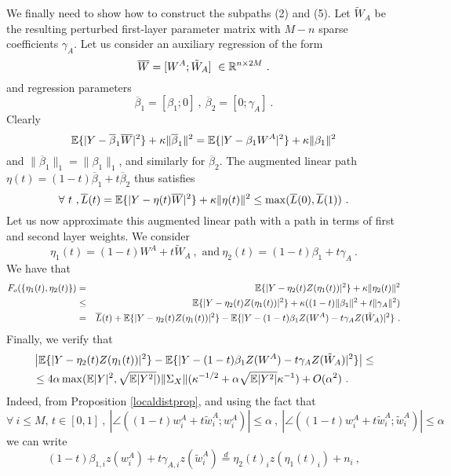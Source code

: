 We finally need to show how to construct the subpaths (2) and (5).
Let $\tilde{W}_A$ be the resulting perturbed first-layer parameter matrix 
with $M-n$ sparse coefficients $\gamma_A$.
Let us consider an auxiliary regression of the form 
$$\overline{W} = [ W^A ; \tilde{W}_A] ~\in {\mathbb{R}}^{n \times 2M}~.$$
and regression parameters 
$$\overline{\beta}_1 = [ \beta_1; 0]~,~\overline{\beta}_2 = [0; \gamma_A]~.$$
Clearly 
$${\mathbb{E}}\{ | Y - \overline{\beta}_1 \overline{W} |^2 \} + \kappa \| \overline{\beta}_1 \|^2 = {\mathbb{E}}\{ | Y - \beta_1 W^A |^2 \} + \kappa \| {\beta}_1 \|^2 $$ 
and $\| \overline{\beta}_1 \|_1 = \| \beta_1 \|_1$, and similarly for $\overline{\beta}_2$. The augmented linear path $\eta(t) =(1- t) \overline{\beta}_1 + t \overline{\beta}_2$ thus satisfies 
$$\forall~t~,\overline{L}(t) = {\mathbb{E}}\{ | Y - \eta(t) \overline{W} |^2 \} + \kappa \| \eta(t) \|^2 \leq \max(\overline{L}(0), \overline{L}(1))~. $$
Let us now approximate this augmented linear path with a path in terms of first and second layer weights. 
We consider
$$\eta_1(t) = (1-t) W^A + t \tilde{W}_A~,\text{ and}~\eta_2(t) = (1- t) {\beta}_1 + t \gamma_A~.$$
We have that 
\begin{eqnarray}
\label{bub1}
F_{o}(\{ \eta_1(t), \eta_2(t) \}) &=& {\mathbb{E}} \{ | Y - \eta_2(t) Z(\eta_1(t) ) |^2 \} + \kappa \| \eta_2(t) \|^2  \\ 
&\leq & {\mathbb{E}} \{ | Y - \eta_2(t) Z(\eta_1(t) ) |^2 \} + \kappa(  ( 1-t) \| {\beta}_1\|^2 + t \| \gamma_A \|^2 ) \nonumber \\
& = & \overline{L}(t) + {\mathbb{E}} \{ | Y - \eta_2(t) Z(\eta_1(t) ) |^2 \}  - {\mathbb{E}} \{ | Y - (1-t) \beta_1 Z(W^A) - t \gamma_A Z(\tilde{W}_A) |^2 \} ~.  \nonumber
\end{eqnarray}
Finally, we verify that
{\small 
\begin{eqnarray}
\label{bub2}
& \left | {\mathbb{E}} \{ | Y - \eta_2(t) Z(\eta_1(t) ) |^2 \}  - {\mathbb{E}} \{ | Y - (1-t) \beta_1 Z(W^A) - t \gamma_A Z(\tilde{W}_A) |^2 \} \right|  \leq\\
& \leq 4  \alpha \max({\mathbb{E}} |Y|^2, \sqrt{{\mathbb{E}}|Y^2|}) \| \Sigma_X \| ( \kappa^{-1/2} + \alpha \sqrt{{\mathbb{E}}|Y^2|} \kappa^{-1}) + O(\alpha^2)~. \nonumber
\end{eqnarray}}
Indeed, from Proposition \ref{localdistprop}, and using the fact that 
$$\forall~i\leq M,\, t \in [0,1]~,~\left| \angle( (1-t)w^A_i + t \tilde{w}^A_i ; w^A_i) \right| \leq \alpha~,~ \left| \angle( (1-t)w^A_i + t \tilde{w}^A_i ; \tilde{w}^A_i) \right| \leq \alpha $$
we can write 
$$(1-t) \beta_{1,i} z(w^A_i) + t \gamma_{A,i} z(\tilde{w}^A_i) \stackrel{d}{=} \eta_2(t)_i z(\eta_1(t)_i) + n_i ~,$$
